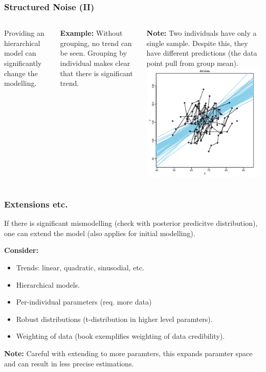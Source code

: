 \documentclass[usenames,dvipsnames,table]{beamer}
\begin{document}
\begin{frame}
\frametitle{Structured Noise (II)}
\begin{columns}
Providing an hierarchical model can significantly change the modelling.

\vspace{1em}
\textbf{Example:} Without grouping, no trend can be seen.
Grouping by individual makes clear that there is significant trend.

\vspace{1em}
\textbf{Note:} Two individuals have only a single sample. Despite this, they have different predictions (the data point pull from group mean).
\includegraphics[width=\textwidth]{img/fig17_5_1}
\end{columns}
\end{frame}


\begin{frame}
\frametitle{Extensions etc.}
If there is significant mismodelling (check with posterior predicitve distribution), one can extend the model (also applies for initial modelling).

\vspace{1em}
\textbf{Consider:} 
\begin{itemize}
  \item Trends: linear, quadratic, sinusodial, etc.
  \item Hierarchical models.
  \item Per-individual parameters (req. more data)
  \item Robust distributions (t-distribution in higher level paramters).
  \item Weighting of data (book exemplifies weighting of data credibility).
\end{itemize}

\textbf{Note:} Careful with extending to more paramters, this expands paramter space and can result in less precise estimations.
\end{frame}
\end{document}
